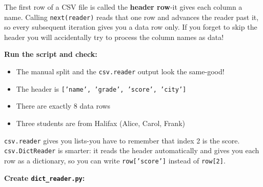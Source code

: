\documentclass{cslab}
\begin{document}
\begin{note}
The first row of a CSV file is called the \textbf{header row}-it gives each column a name. Calling \texttt{next(reader)} reads that one row and advances the reader past it, so every subsequent iteration gives you a data row only. If you forget to skip the header you will accidentally try to process the column names as data!
\end{note}

\textbf{Run the script and check:}
\begin{itemize}
    \item The manual split and the \texttt{csv.reader} output look the same-good!
    \item The header is \texttt{['name', 'grade', 'score', 'city']}
    \item There are exactly 8 data rows
    \item Three students are from Halifax (Alice, Carol, Frank)
\end{itemize}


\texttt{csv.reader} gives you lists-you have to remember that index 2 is the score. \texttt{csv.DictReader} is smarter: it reads the header automatically and gives you each row as a dictionary, so you can write \texttt{row['score']} instead of \texttt{row[2]}.

\textbf{Create \texttt{dict\_reader.py}:}
\end{document}
